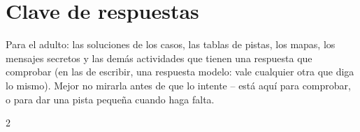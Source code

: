\section*{Clave de respuestas}

Para el adulto: las soluciones de los casos, las tablas de pistas, los
mapas, los mensajes secretos y las demás actividades que tienen una
respuesta que comprobar (en las de escribir, una respuesta modelo: vale
cualquier otra que diga lo mismo). Mejor no mirarla antes de que lo
intente -- está aquí para comprobar, o para dar una pista pequeña cuando
haga falta.

\begin{multicols}{2}
\footnotesize
\begin{itemize}[leftmargin=0mm, label={}, itemsep=2mm, topsep=0mm]

\end{itemize}
\end{multicols}
\newpage
